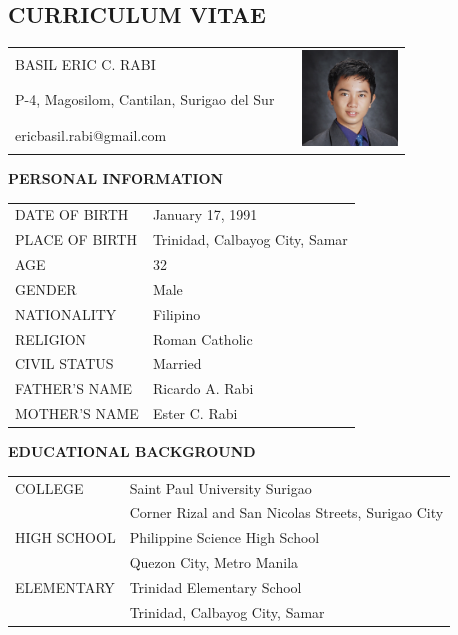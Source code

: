 \documentclass[12pt]{report}
\newcommand{\authora}{
    Basil Eric C. Rabi %
}
\begin{document}
\begin{spacing}{1.55}

\chapter*{CURRICULUM VITAE}

\begin{tabularx}{\linewidth}{@{}lXr}
    \MakeUppercase{\authora} && \multirow{3}{*}{\includegraphics[width=1in]{img/rabi}} \\
    P-4, Magosilom, Cantilan, Surigao del Sur && \\
    ericbasil.rabi@gmail.com && \\
\end{tabularx}

\vspace{20pt}

\textbf{PERSONAL INFORMATION}

\vspace{-10pt}
\hrulefill

\begin{tabular}{@{}l@{ : }l}
    DATE OF BIRTH & January 17, 1991 \\
    PLACE OF BIRTH & Trinidad, Calbayog City, Samar \\
    AGE & 32 \\
    GENDER & Male \\
    NATIONALITY & Filipino \\
    RELIGION & Roman Catholic \\
    CIVIL STATUS & Married \\
    FATHER'S NAME & Ricardo A. Rabi \\
    MOTHER'S NAME & Ester C. Rabi \\
\end{tabular}

\vspace{20pt}

\textbf{EDUCATIONAL BACKGROUND}

\vspace{-10pt}
\hrulefill

\begin{tabular}{@{}l@{ : }l}
    COLLEGE & Saint Paul University Surigao \\
    & Corner Rizal and San Nicolas Streets, Surigao City \\
    HIGH SCHOOL & Philippine Science High School \\
    & Quezon City, Metro Manila \\
    ELEMENTARY & Trinidad Elementary School \\
    & Trinidad, Calbayog City, Samar \\
\end{tabular}


\end{spacing}
\end{document}
